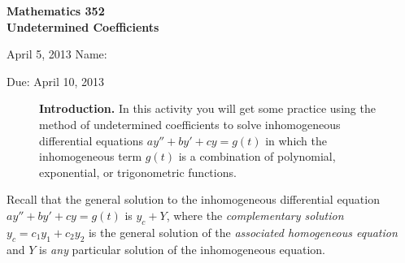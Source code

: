 \documentclass[answers,11pt]{exam}
\begin{document}
\noindent
\textbf{{\large Mathematics 352 \\ Undetermined Coefficients}}

\noindent
April 5, 2013 \hfill Name: \underline{\hspace{3in}} 

\noindent
Due: April 10, 2013

\noindent
\begin{figure}[h]
\centering
\begin{minipage}[b]{0.85\linewidth}
\textbf{Introduction.} In this activity you will get some practice using the method of undetermined coefficients to solve inhomogeneous differential equations $ay'' + by' + cy = g(t)$ in which the inhomogeneous term $g(t)$ is a combination of polynomial, exponential, or trigonometric functions.
\end{minipage}
\end{figure}

Recall that the general solution to the inhomogeneous differential equation $ay'' + by' + cy = g(t)$ is $y_c + Y$, where the \emph{complementary solution} $y_c = c_1 y_1 + c_2 y_2$ is the general solution of the \emph{associated homogeneous equation} and $Y$ is \emph{any} particular solution of the inhomogeneous equation.
\end{document}
